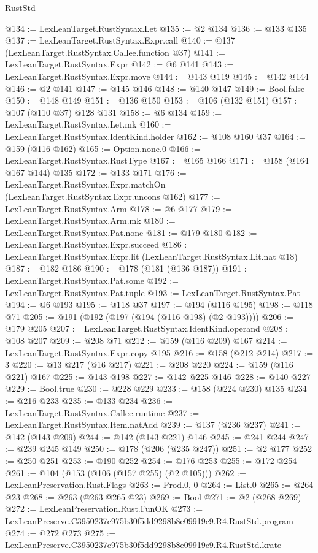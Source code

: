 \begin{lexlean}{RustStd}
\begin{coremodule}
@134 := LexLeanTarget.RustSyntax.Let
@135 := @2 @134
@136 := @133 @135
@137 := LexLeanTarget.RustSyntax.Expr.call
@140 := @137 (LexLeanTarget.RustSyntax.Callee.function @37)
@141 := LexLeanTarget.RustSyntax.Expr
@142 := @6 @141
@143 := LexLeanTarget.RustSyntax.Expr.move
@144 := @143 @119
@145 := @142 @144
@146 := @2 @141
@147 := @145 @146
@148 := @140 @147
@149 := Bool.false
@150 := @148 @149
@151 := @136 @150
@153 := @106 (@132 @151)
@157 := @107 (@110 @37) @128 @131
@158 := @6 @134
@159 := LexLeanTarget.RustSyntax.Let.mk
@160 := LexLeanTarget.RustSyntax.IdentKind.holder
@162 := @108 @160 @37
@164 := @159 (@116 @162)
@165 := Option.none.{0}
@166 := LexLeanTarget.RustSyntax.RustType
@167 := @165 @166
@171 := @158 (@164 @167 @144) @135
@172 := @133 @171
@176 := LexLeanTarget.RustSyntax.Expr.matchOn (LexLeanTarget.RustSyntax.Expr.uncons @162)
@177 := LexLeanTarget.RustSyntax.Arm
@178 := @6 @177
@179 := LexLeanTarget.RustSyntax.Arm.mk
@180 := LexLeanTarget.RustSyntax.Pat.none
@181 := @179 @180
@182 := LexLeanTarget.RustSyntax.Expr.succeed
@186 := LexLeanTarget.RustSyntax.Expr.lit (LexLeanTarget.RustSyntax.Lit.nat @18)
@187 := @182 @186
@190 := @178 (@181 (@136 @187))
@191 := LexLeanTarget.RustSyntax.Pat.some
@192 := LexLeanTarget.RustSyntax.Pat.tuple
@193 := LexLeanTarget.RustSyntax.Pat
@194 := @6 @193
@195 := @118 @37
@197 := @194 (@116 @195)
@198 := @118 @71
@205 := @191 (@192 (@197 (@194 (@116 @198) (@2 @193))))
@206 := @179 @205
@207 := LexLeanTarget.RustSyntax.IdentKind.operand
@208 := @108 @207
@209 := @208 @71
@212 := @159 (@116 @209) @167
@214 := LexLeanTarget.RustSyntax.Expr.copy @195
@216 := @158 (@212 @214)
@217 := 3
@220 := @13 @217 (@16 @217)
@221 := @208 @220
@224 := @159 (@116 @221) @167
@225 := @143 @198
@227 := @142 @225 @146
@228 := @140 @227
@229 := Bool.true
@230 := @228 @229
@233 := @158 (@224 @230) @135
@234 := @216 @233
@235 := @133 @234
@236 := LexLeanTarget.RustSyntax.Callee.runtime
@237 := LexLeanTarget.RustSyntax.Item.natAdd
@239 := @137 (@236 @237)
@241 := @142 (@143 @209)
@244 := @142 (@143 @221) @146
@245 := @241 @244
@247 := @239 @245 @149
@250 := @178 (@206 (@235 @247))
@251 := @2 @177
@252 := @250 @251
@253 := @190 @252
@254 := @176 @253
@255 := @172 @254
@261 := @104 (@153 (@106 (@157 @255) (@2 @105)))
@262 := LexLeanPreservation.Rust.Flags
@263 := Prod.{0, 0}
@264 := List.{0}
@265 := @264 @23
@268 := @263 (@263 @265 @23)
@269 := Bool
@271 := @2 (@268 @269)
@272 := LexLeanPreservation.Rust.FunOK
@273 := LexLeanPreserve.C3950237c975b30f5dd9298b8e09919c9.R4.RustStd.program
@274 := @272 @273
@275 := LexLeanPreserve.C3950237c975b30f5dd9298b8e09919c9.R4.RustStd.krate

\end{coremodule}
\end{lexlean}

